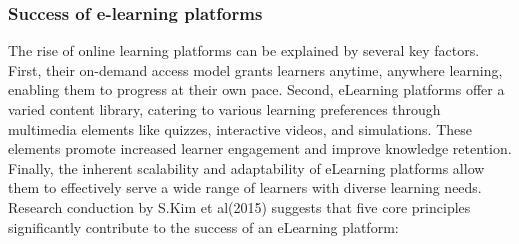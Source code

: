 \documentclass[a4paper,12pt]{article}  %
\begin{document}
\subsubsection{Success of  e-learning  platforms}
The rise of online learning platforms can be explained by several key factors.
First, their on-demand access model grants learners anytime, anywhere learning,
enabling them to progress at their own pace. Second, eLearning platforms offer
a varied content library, catering to various learning preferences through
multimedia elements like quizzes, interactive videos, and simulations. These
elements promote increased learner engagement and improve knowledge retention.
Finally, the inherent scalability and adaptability of eLearning platforms allow
them to effectively serve a wide range of learners with diverse learning needs.
Research conduction by S.Kim et al(2015)\cite{kim2023better} suggests that five
core principles significantly contribute to the success of an eLearning
platform:\\
\end{document}
